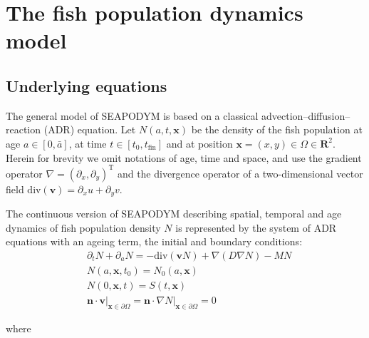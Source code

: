 \chapter{The fish population dynamics model}
\label{ch:model}

\section{Underlying equations}
\label{sec:underlying-equations}

The general model of SEAPODYM is based on a classical advection--diffusion--reaction (ADR) equation. Let $N(a,t,\mathbf{x})$ be the density of the fish population at age $a \in \left[0,\bar{a}\right]$, at time $t \in \left[t_0,t_{\text{fin}}\right]$ and at position $\mathbf{x}=(x,y) \in \Omega \in \mathbf{R}^2$. Herein for brevity we omit notations of age, time and space, and use the gradient operator $\nabla = (\partial_x, \partial_y)^{\text{T}}$ and the divergence operator of a two-dimensional vector field $\text{div}(\mathbf v)=\partial_x u+\partial_y v$.
\begin{linenomath}
The continuous version of SEAPODYM describing spatial, temporal and age dynamics of fish population density $N$ is represented by the system of ADR equations with an ageing term, the initial and boundary conditions:
\begin{align}
& \partial_t N+\partial_a N =-\text{div} (\mathbf{v} N ) +\nabla (D \nabla N) - M N \label{eq:model-1}\\
& N(a,\mathbf{x},t_0)  = N_0 (a,\mathbf{x})  \label{eq:model-2} \\
& N(0,\mathbf{x},t) =  S(t,\mathbf{x}) \label{eq:model-3}\\
& \mathbf n \cdot \mathbf v \Bigr\rvert_{\mathbf x \in \partial \Omega} = \mathbf n \cdot\nabla N \Bigr\rvert_{\mathbf x \in \partial \Omega} = 0 \label{eq:model-4}  
\end{align}
\end{linenomath}
where 
